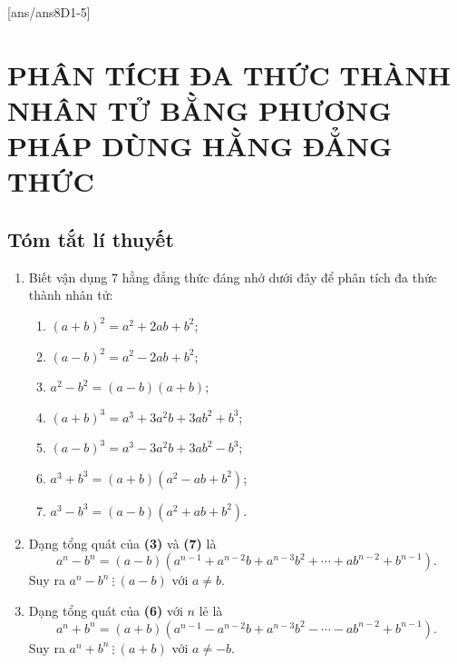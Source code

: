 [ans/ans8D1-5]
\section{PHÂN TÍCH ĐA THỨC THÀNH NHÂN TỬ BẰNG PHƯƠNG PHÁP DÙNG HẰNG ĐẲNG THỨC}
\subsection{Tóm tắt lí thuyết}
	\begin{enumerate}[\tickEX]
		\item Biết vận dụng $7$ hằng đẳng thức đáng nhớ dưới đây để phân tích đa thức thành nhân tử:
			\begin{enumerate}[\bfseries (1)]
				\item $(a+b)^2 = a^2 + 2ab + b^2$;
				\item $(a-b)^2 = a^2 - 2ab + b^2$;
				\item $a^2 - b^2 = (a-b)(a+b)$;
				\item $(a+b)^3 = a^3 + 3a^2b + 3ab^2 + b^3$;
				\item $(a-b)^3 = a^3 - 3a^2b + 3ab^2 - b^3$;
				\item $a^3 + b^3 = (a+b)\left(a^2 - ab + b^2\right)$;
				\item $a^3 - b^3 = (a-b)\left(a^2 + ab + b^2\right)$.
			\end{enumerate}
		\item Dạng tổng quát của \textbf{(3)} và \textbf{(7)} là
			\[a^n - b^n = (a-b)\left(a^{n-1} + a^{n-2}b + a^{n-3}b^2 + \cdots + ab^{n-2} + b^{n-1}\right).\]
	Suy ra 		$a^n - b^n \ \vdots \ (a-b)$ với $a \ne b$.
		\item Dạng tổng quát của \textbf{(6)} với $n$ lẻ là
			\[a^n + b^n = (a+b)\left(a^{n-1} - a^{n-2}b + a^{n-3}b^2 - \cdots - ab^{n-2} + b^{n-1} \right).\]
	Suy ra 		$ a^n + b^n \ \vdots \ (a+b)$ với $a \ne -b$.
	\end{enumerate}

